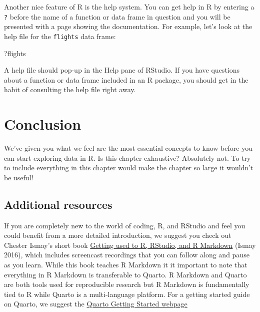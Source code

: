 \documentclass[
  letterpaper,
  DIV=11,
  numbers=noendperiod]{scrreprt}
\newenvironment{Shaded}{\begin{snugshade}}{\end{snugshade}}
\newcommand{\NormalTok}[1]{\textcolor[rgb]{0.00,0.23,0.31}{#1}}
\theoremstyle{definition}
\theoremstyle{remark}
\begin{document}
Another nice feature of R is the help system. You can get help in R by
entering a \texttt{?} before the name of a function or data frame in
question and you will be presented with a page showing the
documentation. For example, let's look at the help file for the
\texttt{flights} data frame:

\begin{Shaded}
\begin{Highlighting}[]
\NormalTok{?flights}
\end{Highlighting}
\end{Shaded}

A help file should pop-up in the Help pane of RStudio. If you have
questions about a function or data frame included in an R package, you
should get in the habit of consulting the help file right away.

\hypertarget{sec-gs-conclusion}{%
\section{Conclusion}\label{sec-gs-conclusion}}

We've given you what we feel are the most essential concepts to know
before you can start exploring data in R. Is this chapter exhaustive?
Absolutely not. To try to include everything in this chapter would make
the chapter so large it wouldn't be useful!

\hypertarget{additional-resources}{%
\subsection{Additional resources}\label{additional-resources}}

If you are completely new to the world of coding, R, and RStudio and
feel you could benefit from a more detailed introduction, we suggest you
check out Chester Ismay's short book
\href{https://rbasics.netlify.com/}{Getting used to R, RStudio, and R
Markdown} (Ismay 2016), which includes screencast recordings that you
can follow along and pause as you learn. While this book teaches R
Markdown it it important to note that everything in R Markdown is
transferable to Quarto. R Markdown and Quarto are both tools used for
reproducible research but R Markdown is fundamentally tied to R while
Quarto is a multi-language platform. For a getting started guide on
Quarto, we suggest the
\href{https://quarto.org/docs/get-started/hello/rstudio.html}{Quarto
Getting Started webpage}
\end{document}
